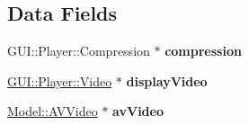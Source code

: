 \subsection*{Data Fields}
\begin{DoxyCompactItemize}
\item 
\hypertarget{classModel_1_1YuvVideo_ac2a5dc0f24145e88e386d608c3d811d4}{}G\+U\+I\+::\+Player\+::\+Compression $\ast$ {\bfseries compression}\label{classModel_1_1YuvVideo_ac2a5dc0f24145e88e386d608c3d811d4}

\item 
\hypertarget{classModel_1_1YuvVideo_a17f257b55491782940deb4e086adecbb}{}\hyperlink{classGUI_1_1Player_1_1Video}{G\+U\+I\+::\+Player\+::\+Video} $\ast$ {\bfseries display\+Video}\label{classModel_1_1YuvVideo_a17f257b55491782940deb4e086adecbb}

\item 
\hypertarget{classModel_1_1YuvVideo_a270efc836b2d2c70aec72106128ff89f}{}\hyperlink{classModel_1_1AVVideo}{Model\+::\+A\+V\+Video} $\ast$ {\bfseries av\+Video}\label{classModel_1_1YuvVideo_a270efc836b2d2c70aec72106128ff89f}

\end{DoxyCompactItemize}
